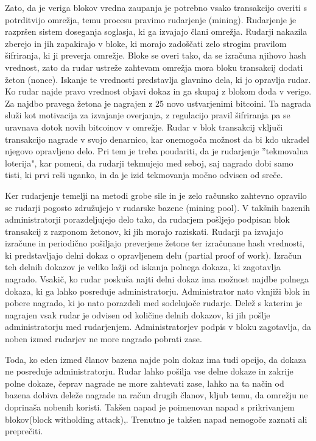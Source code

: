 \documentclass{acm_proc_article-sp}
\begin{document}
Zato, da je veriga blokov vredna zaupanja je potrebno vsako transakcijo overiti s potrditvijo omrežja, temu procesu pravimo rudarjenje (mining). Rudarjenje je razpršen sistem doseganja soglasja, ki ga izvajajo člani omrežja. Rudarji nakazila zberejo in jih zapakirajo v bloke, ki morajo zadoščati zelo strogim pravilom šifriranja, ki ji preverja omrežje.  Bloke se overi tako, da se izračuna njihovo hash vrednost, zato da rudar ustreže zahtevam omrežja mora bloku transakcij dodati žeton (nonce). Iskanje te vrednosti predstavlja glavnino dela, ki jo opravlja rudar. Ko rudar najde pravo vrednost objavi dokaz in ga skupaj z blokom doda v verigo. Za najdbo pravega žetona je nagrajen z 25 novo ustvarjenimi bitcoini. Ta nagrada služi kot motivacija za izvajanje overjanja, z regulacijo pravil šifriranja pa se uravnava dotok novih bitcoinov v omrežje. Rudar v blok transakcij vključi transakcijo nagrade v svojo denarnico, kar onemogoča možnost da bi kdo ukradel njegovo opravljeno delo. Pri tem je treba poudariti, da je rudarjenje ''tekmovalna loterija", kar pomeni, da rudarji tekmujejo med seboj, saj nagrado dobi samo tisti, ki prvi reši uganko, in da je izid tekmovanja močno odvisen od sreče.

Ker rudarjenje temelji na metodi grobe sile in je zelo računsko zahtevno opravilo se rudarji pogosto združujejo v rudarske bazene (mining pool). V takšnih bazenih administratorji porazdeljujejo delo tako, da rudarjem pošljejo podpisan blok transakcij z razponom žetonov, ki jih morajo raziskati. Rudarji pa izvajajo izračune in periodično pošiljajo preverjene žetone ter izračunane hash vrednosti, ki predstavljajo delni dokaz o opravljenem delu (partial proof of work). Izračun teh delnih dokazov je veliko lažji od iskanja polnega dokaza, ki zagotavlja nagrado. Vsakič, ko rudar poskuša najti delni dokaz ima možnost najdbe polnega dokaza, ki ga lahko posreduje administratorju. Administrator nato vknjiži blok in pobere nagrado, ki jo nato porazdeli med sodelujoče rudarje. Delež s katerim je nagrajen vsak rudar je odvisen od količine delnih dokazov, ki jih pošlje administratorju med rudarjenjem. Administratorjev podpis v bloku zagotavlja, da noben izmed rudarjev ne more nagrado pobrati zase.

Toda, ko eden izmed članov bazena najde poln dokaz ima tudi opcijo, da dokaza ne posreduje administratorju. Rudar lahko pošilja vse delne dokaze in zakrije polne dokaze, čeprav nagrade ne more zahtevati zase, lahko na ta način od bazena dobiva deleže nagrade na račun drugih članov, kljub temu, da omrežju ne doprinaša nobenih koristi. Takšen napad je poimenovan napad s prikrivanjem blokov(block witholding attack)\cite{analysisofbitcoin},\cite{financialcryptography}. Trenutno je takšen napad nemogoče zaznati ali preprečiti.
\end{document}
